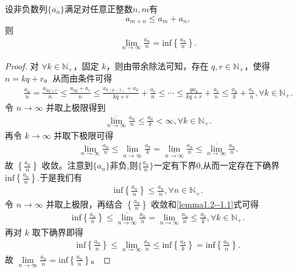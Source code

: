 \documentclass[../../main.tex]{subfiles}%
\begin{document}
\begin{lemma}\label{proposition:Fekete次可加性引理}
设非负数列\(\{a_{n}\}\)满足对任意正整数\(n,m\)有
\[a_{m + n}\leqslant  a_{m}+a_{n},\]
则
\begin{align*}
\underset{n\rightarrow \infty}{\lim}\frac{a_n}{n}=\mathrm{inf}\left\{ \frac{a_n}{n} \right\} .
\end{align*}
\end{lemma}
\begin{proof}

对 $\forall k\in \mathbb{N} _+$，固定 $k$，则由带余除法可知，存在 $q,r\in \mathbb{N} _+$，使得 $n=kq+r$。从而由条件可得
\begin{align*}
\frac{a_n}{n}=\frac{a_{kq+r}}{n}\leqslant \frac{a_{kq}+a_r}{n}\leqslant \frac{a_{k\left( q-1 \right)}+a_k}{kq+r}+\frac{a_r}{n}\leqslant \cdots \leqslant \frac{qa_k}{kq+r}+\frac{a_r}{n}\leqslant \frac{a_k}{k}+\frac{a_r}{n},\forall k\in \mathbb{N} _+.
\end{align*}
令 $n\rightarrow \infty$ 并取上极限得到
\begin{align}
\underset{n\rightarrow \infty}{\overline{\lim }}\frac{a_n}{n}\leqslant \frac{a_k}{k}<\infty ,\forall k\in \mathbb{N} _+.\label{lemma1.2--1.1}
\end{align}
再令 $k\rightarrow \infty$ 并取下极限可得
\begin{align*}
\underset{n\rightarrow \infty}{\overline{\lim }}\frac{a_n}{n}\leqslant \underset{n\rightarrow \infty}{\underline{\lim }}\frac{a_k}{k}=\underset{n\rightarrow \infty}{\underline{\lim }}\frac{a_n}{n}\leqslant \underset{n\rightarrow \infty}{\overline{\lim }}\frac{a_n}{n}.
\end{align*}
故 $\left\{ \frac{a_n}{n} \right\}$ 收敛。注意到$\{a_n\}$非负,则$\{\frac{a_n}{n}\}$一定有下界0,从而一定存在下确界$\mathrm{inf}\left\{ \frac{a_n}{n} \right\}$.于是我们有
\begin{align*}
\mathrm{inf}\left\{ \frac{a_n}{n} \right\} \leqslant \frac{a_n}{n},\forall n\in \mathbb{N} _+.
\end{align*}
令 $n\rightarrow \infty$ 并取上极限，再结合 $\left\{ \frac{a_n}{n} \right\}$ 收敛和\eqref{lemma1.2--1.1}式可得
\begin{align*}
\mathrm{inf}\left\{ \frac{a_n}{n} \right\} \leqslant \underset{n\rightarrow \infty}{\overline{\lim }}\frac{a_n}{n}=\underset{n\rightarrow \infty}{\lim}\frac{a_n}{n}\leqslant \frac{a_k}{k},\forall k\in \mathbb{N} _+.
\end{align*}
再对 $k$ 取下确界即得
\begin{align*}
\mathrm{inf}\left\{ \frac{a_n}{n} \right\} \leqslant \underset{n\rightarrow \infty}{\lim}\frac{a_n}{n}\leqslant \mathrm{inf}\left\{ \frac{a_k}{k} \right\} =\mathrm{inf}\left\{ \frac{a_n}{n} \right\} .
\end{align*}
故 $\underset{n\rightarrow \infty}{\lim}\frac{a_n}{n}=\mathrm{inf}\left\{ \frac{a_n}{n} \right\}$。

\end{proof}
\end{document}
